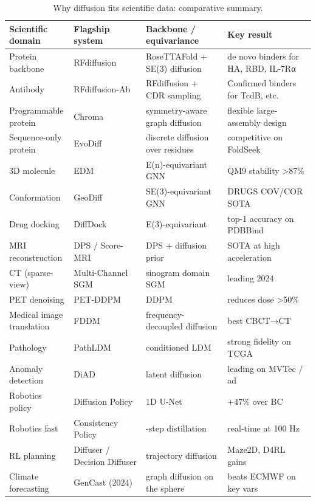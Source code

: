 \documentclass{article}
\begin{document}
\begin{table}[t]
\centering
\caption{Why diffusion fits scientific data: comparative summary.}
\label{tab:why-diffusion-fits-scientific-data}
\begin{tabular}{>{\raggedright\arraybackslash}p{0.2066\linewidth}
  >{\raggedright\arraybackslash}p{0.2397\linewidth}
  >{\raggedright\arraybackslash}p{0.2645\linewidth}
  >{\raggedright\arraybackslash}p{0.2893\linewidth}}
\toprule
Scientific domain & Flagship system & Backbone / equivariance & Key result \\
\midrule
Protein backbone & RFdiffusion & RoseTTAFold + SE(3) diffusion & de novo binders for HA, RBD, IL-7Rα \\
Antibody & RFdiffusion-Ab \citep{bennett20242024} & RFdiffusion + CDR sampling & Confirmed binders for TcdB, etc. \\
Programmable protein & Chroma \citep{ingraham20232023} & symmetry-aware graph diffusion & flexible large-assembly design \\
Sequence-only protein & EvoDiff & discrete diffusion over residues & competitive on FoldSeek \\
3D molecule & EDM \citep{hoogeboom2022equivariantdiffusi} & E(n)-equivariant GNN & QM9 stability \textgreater87\% \\
Conformation & GeoDiff & SE(3)-equivariant GNN & DRUGS COV/COR SOTA \\
Drug docking & DiffDock & E(3)-equivariant & top-1 accuracy on PDBBind \\
MRI reconstruction & DPS / Score-MRI & DPS + diffusion prior & SOTA at high acceleration \\
CT (sparse-view) & Multi-Channel SGM & sinogram domain SGM & leading 2024 \\
PET denoising & PET-DDPM \citep{gong20232023} & DDPM & reduces dose \textgreater50\% \\
Medical image translation & FDDM & frequency-decoupled diffusion & best CBCT→CT \\
Pathology & PathLDM & conditioned LDM & strong fidelity on TCGA \\
Anomaly detection & DiAD & latent diffusion & leading on MVTec / ad \\
Robotics policy & Diffusion Policy & 1D U-Net & +47\% over BC \\
Robotics fast & Consistency Policy & 1-step distillation & real-time at 100 Hz \\
RL planning & Diffuser / Decision Diffuser & trajectory diffusion & Maze2D, D4RL gains \\
Climate forecasting & GenCast (2024) & graph diffusion on the sphere & beats ECMWF on key vars \\
\end{tabular}
\end{table}
\end{document}
